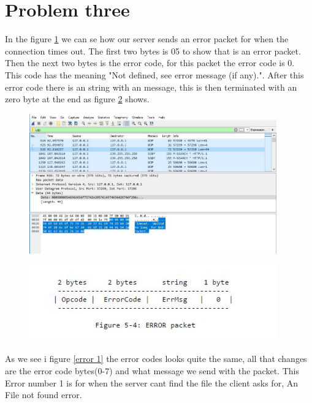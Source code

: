 \documentclass[a4paper,12pt]{article}
\numberwithin{figure}{section}
\begin{document}
\clearpage
\newpage

\section{Problem three}

In the figure \ref{error 0} we can se how our server sends an error packet for when the connection times out. The first two bytes is 05 to show that is an error packet. Then the next two bytes is the error code, for this packet the error code is 0. This code has the meaning "Not defined, see error message (if any)."\cite{RFC1350}. After this error code there is an string with an message, this is then terminated with an zero byte at the end as figure \ref{errorPacket} shows.

\begin{figure}[h!]
	\centering
	\includegraphics[width=0.95\textwidth,keepaspectratio]{img/error0.jpg} 
	\caption{}
	\label{error 0}
\end{figure}
\begin{figure}[h!]
	\centering
	\includegraphics[width=0.95\textwidth,keepaspectratio]{img/errorPacket.jpg} 
	\caption{}
	\label{errorPacket}
\end{figure}

\noindent As we see i figure \ref{error 1} the error codes looks quite the same, all that changes are the error code bytes(0-7) and what message we send with the packet. This Error number 1 is for when the server cant find the file the client asks for, An File not found error.
\end{document}

